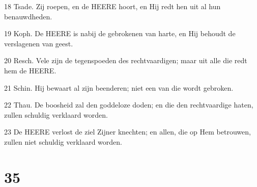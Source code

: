\par 18 Tsade. Zij roepen, en de HEERE hoort, en Hij redt hen uit al hun benauwdheden.
\par 19 Koph. De HEERE is nabij de gebrokenen van harte, en Hij behoudt de verslagenen van geest.
\par 20 Resch. Vele zijn de tegenspoeden des rechtvaardigen; maar uit alle die redt hem de HEERE.
\par 21 Schin. Hij bewaart al zijn beenderen; niet een van die wordt gebroken.
\par 22 Thau. De boosheid zal den goddeloze doden; en die den rechtvaardige haten, zullen schuldig verklaard worden.
\par 23 De HEERE verlost de ziel Zijner knechten; en allen, die op Hem betrouwen, zullen niet schuldig verklaard worden.

\chapter{35}

